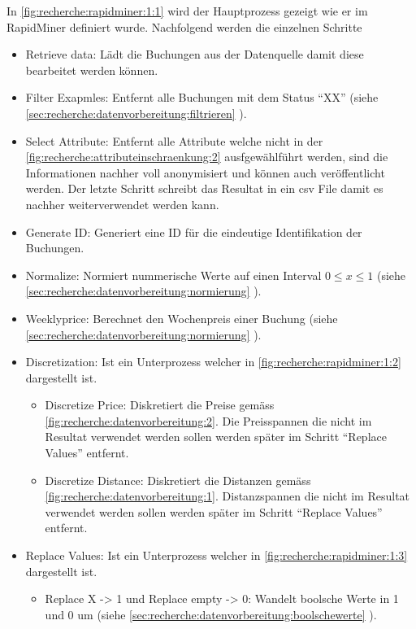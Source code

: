  In \ref{fig:recherche:rapidminer:1:1} wird der Hauptprozess gezeigt wie er im RapidMiner definiert wurde. Nachfolgend werden die einzelnen Schritte 
 \begin{itemize}
 	\item Retrieve data: Lädt die Buchungen aus der Datenquelle damit diese bearbeitet werden können. 
 	\item Filter Exapmles: Entfernt alle Buchungen mit dem Status "`XX"' (siehe \cref{sec:recherche:datenvorbereitung:filtrieren} ).
 	\item Select Attribute: Entfernt alle Attribute welche nicht in der \cref{fig:recherche:attributeinschraenkung:2} ausfgewählführt werden, sind die Informationen nachher voll anonymisiert und können auch veröffentlicht werden. Der letzte Schritt schreibt das Resultat in ein \gls{csv} File damit es nachher weiterverwendet werden kann.
 	\item Generate ID: Generiert eine ID für die eindeutige Identifikation der Buchungen.
 	\item Normalize: Normiert nummerische Werte auf einen Interval $0 \leq x \leq 1$ (siehe \cref{sec:recherche:datenvorbereitung:normierung} ).
 	\item Weeklyprice: Berechnet den Wochenpreis einer Buchung (siehe \cref{sec:recherche:datenvorbereitung:normierung} ).
 	\item Discretization: Ist ein Unterprozess welcher in \cref{fig:recherche:rapidminer:1:2} dargestellt ist.
	 	\begin{itemize}
	 		\item Discretize Price: Diskretiert die Preise gemäss \cref{fig:recherche:datenvorbereitung:2}. Die Preisspannen die nicht im Resultat verwendet werden sollen werden später im Schritt "`Replace Values"' entfernt.
	 		\item Discretize Distance: Diskretiert die Distanzen gemäss \cref{fig:recherche:datenvorbereitung:1}. Distanzspannen die nicht im Resultat verwendet werden sollen werden später im Schritt "`Replace Values"' entfernt.
	 	\end{itemize}
 	\item Replace Values: Ist ein Unterprozess welcher in \cref{fig:recherche:rapidminer:1:3} dargestellt ist.
 		\begin{itemize}
			\item Replace X -> 1 und Replace empty -> 0: Wandelt boolsche Werte in 1 und 0 um (siehe \cref{sec:recherche:datenvorbereitung:boolschewerte} ). 

\end{itemize}
\end{itemize}
